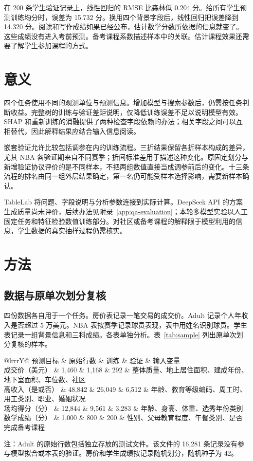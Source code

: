 \documentclass[12pt,journal,onecolumn,a4paper]{IEEEtran}
\newcommand{\tabnote}[1]{\par\vspace{2pt}\begin{minipage}{\linewidth}\footnotesize #1\end{minipage}}
\newcommand{\inlinetab}[1]{\begin{table}[!htbp]\centering\small #1\end{table}}
\begin{document}
在 200 条学生验证记录上，线性回归的 RMSE 比森林低 0.204 分。给所有学生预测训练均分时，误差为 15.732 分。换用四个背景字段后，线性回归把误差降到 14.320 分。阅读和写作成绩如果已经公布，估计数学分数所依据的信息就变了。这些成绩没有进入考前预测。备考课程系数描述样本中的关联。估计课程效果还需要了解学生参加课程的方式。


\section{意义}
四个任务使用不同的观测单位与预测信息。增加模型与搜索参数后，仍需按任务判断收益。完整树的训练与验证差距说明，仅降低训练误差不足以说明模型有效。SHAP 和重新训练的消融提供了两种检查字段依赖的办法；相关字段之间可以互相替代，因此解释结果应结合输入信息阅读。

嵌套验证允许比较包括调参在内的训练流程。三折结果保留各折样本构成的差异，尤其 NBA 各验证期来自不同赛季；折间标准差用于描述这种变化。原固定划分与新增验证协议评价的是不同样本，不把两组数值直接当成调参前后的变化。十三条流程的排名由同一组外层结果确定，第一名仍可能受样本选择影响，需要新样本确认。

TableLab 将问题、字段说明与分析参数连接到实际计算。DeepSeek API 的方案生成质量尚未评价，后续办法见附录~\ref{app:qa-evaluation}；本轮多模型实验以人工固定任务和特征检验数值训练部分。对社区或备考课程的解释限于模型利用的信息，学生数据的真实抽样过程仍需核实。

\section{方法}
\subsection{数据与原单次划分复核}
四份数据各自用于一个任务。房价表记录一笔交易的成交价。Adult 记录个人年收入是否超过 5 万美元。NBA 表按赛季记录球员表现，表中用姓名识别球员。学生表记录一组背景信息和三科成绩。各表单独分析。表~\ref{tab:sample} 列出原单次划分复核的样本。
\inlinetab{\label{tab:sample}
\begin{tabularx}{\linewidth}{@{}lrrrY@{}}\toprule
预测目标 & 原始行数 & 训练 & 验证 & 输入变量\\\midrule
成交价（美元） & 1,460 & 1,168 & 292 & 整体质量、地上居住面积、建成年份、地下室面积、车位数、社区\\
高收入（是或否） & 48,842 & 26,049 & 6,512 & 年龄、教育等级编码、周工时、用工类别、职业、婚姻状况\\
场均得分（分） & 12,844 & 9,561 & 3,283 & 年龄、身高、体重、选秀年份类别\\
数学成绩（分） & 1,000 & 800 & 200 & 性别、父母教育程度、午餐类别、是否完成备考课程\\\bottomrule
\end{tabularx}
\tabnote{注：Adult 的原始行数包括独立存放的测试文件。该文件的 16,281 条记录没有参与模型拟合或本表的验证。房价和学生成绩按记录随机划分，随机种子为 42。}}
\end{document}

